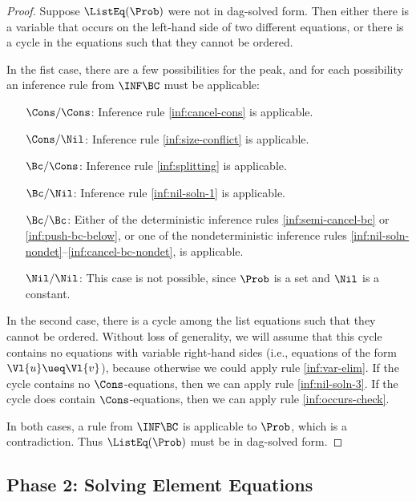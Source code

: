 \begin{proof}
    Suppose $\ListEq(\Prob)$ were not in dag-solved form. Then either there
    is a variable that occurs on the left-hand side of two different equations,
    or there is a cycle in the equations such that they cannot be ordered.

    In the fist case, there are a few possibilities for the peak, and for each
    possibility an inference rule from $\INF\BC$ must be applicable:
    \begin{itemize}[align=left]
        \item[$\Cons/\Cons$:] Inference rule \ref{inf:cancel-cons} is applicable.
        \item[$\Cons/\Nil$:] Inference rule \ref{inf:size-conflict} is
            applicable.
        \item[$\Bc/\Cons$:] Inference rule \ref{inf:splitting} is applicable.
        \item[$\Bc/\Nil$:] Inference rule \ref{inf:nil-soln-1} is applicable.
        \item[$\Bc/\Bc$:] Either of the deterministic inference rules
            \ref{inf:semi-cancel-bc} or \ref{inf:push-bc-below}, or one of the
            nondeterministic inference rules
            \ref{inf:nil-soln-nondet}--\ref{inf:cancel-bc-nondet}, is
            applicable.
        \item[$\Nil/\Nil$:] This case is not possible, since $\Prob$ is a set
            and $\Nil$ is a constant.
    \end{itemize}

    In the second case, there is a cycle among the list equations such that
    they cannot be ordered. Without loss of generality, we will assume that
    this cycle contains no equations with variable right-hand sides (i.e.,
    equations of the form $\Vl{u} \ueq \Vl{v}$), because otherwise we could
    apply rule \ref{inf:var-elim}. If the cycle contains no $\Cons$-equations,
    then we can apply rule \ref{inf:nil-soln-3}. If the cycle does contain
    $\Cons$-equations, then we can apply rule \ref{inf:occurs-check}.

    In both cases, a rule from $\INF\BC$ is applicable to $\Prob$, which is
    a contradiction. Thus $\ListEq(\Prob)$ must be in dag-solved form.
\end{proof}

\subsection{Phase 2: Solving Element Equations}

